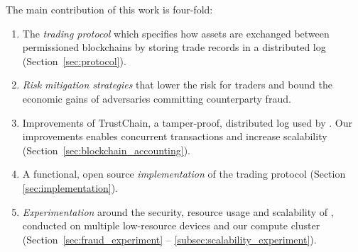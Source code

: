 
The main contribution of this work is four-fold:
\begin{enumerate}
	\item The \ModelName{} \emph{trading protocol} which specifies how assets are exchanged between permissioned blockchains by storing trade records in a distributed log (Section~\ref{sec:protocol}).
	\item \emph{Risk mitigation strategies} that lower the risk for traders and bound the economic gains of adversaries committing counterparty fraud.
	\item Improvements of TrustChain, a tamper-proof, distributed log used by \ModelName{}. Our improvements enables concurrent transactions and increase scalability (Section~\ref{sec:blockchain_accounting}).
	\item A functional, open source \emph{implementation} of the \ModelName{} trading protocol (Section \ref{sec:implementation}).
	\item \emph{Experimentation} around the security, resource usage and scalability of \ModelName{}, conducted on multiple low-resource devices and our compute cluster (Section~\ref{sec:fraud_experiment} -- \ref{subsec:scalability_experiment}).
\end{enumerate}

